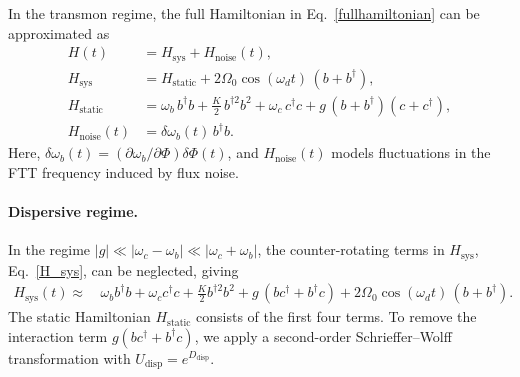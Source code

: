 In the transmon regime, the full Hamiltonian in Eq.~\eqref{fullhamiltonian} can be approximated as
\begin{align}
H(t) &= H_{\mathrm{sys}} + H_{\mathrm{noise}}(t),\label{H_sys}\\
H_{\mathrm{sys}} &= H_{\mathrm{static}}+ 2\Omega_0 \cos(\omega_d t)\,(b + b^\dagger),\\
H_{\mathrm{static}} &=
\omega_b\, b^\dagger b
+ \frac{K}{2}\, b^{\dagger 2} b^{2}
+ \omega_c\, c^\dagger c
+ g\,(b+b^\dagger)(c+c^\dagger), \label{Hstatic}\\
H_{\mathrm{noise}}(t) &= \delta\omega_b(t)\, b^\dagger b .
\end{align}
Here, \(\delta\omega_b(t)=(\partial\omega_b/\partial\Phi)\delta\Phi(t)\), and \(H_{\mathrm{noise}}(t)\) models fluctuations in the FTT frequency induced by flux noise.

\paragraph{Dispersive regime.}
In the regime \(|g| \ll |\omega_c-\omega_b|\ll|\omega_c+\omega_b|\), the counter-rotating terms in \(H_\text{sys}\), Eq.~\eqref{H_sys}, can be neglected, giving
\begin{equation}
\begin{split}
\label{approximated system hamiltonian}
     H_{\mathrm{sys}}(t) \approx \,& \omega_b b^\dagger b + \omega_c c^\dagger c + \frac{K}{2} b^{\dagger 2} b^2 + g\,(bc^\dagger + b^\dagger c) + 2\Omega_0 \cos(\omega_d t)\,(b + b^\dagger).
\end{split}
\end{equation}
The static Hamiltonian \(H_{\text{static}}\) consists of the first four terms. To remove the interaction term \(g(bc^\dagger + b^\dagger c)\), we apply a second-order Schrieffer--Wolff transformation with \(U_{\text{disp}} = e^{D_{\text{disp}}}\).

